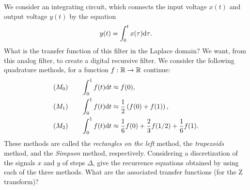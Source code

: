  
\begin{exo}
\label{exo-meth-quadratures-recursive-filter}
 
     We consider an integrating circuit, which connects the input voltage $ x (t) $ and output voltage $ y (t) $ by the equation
\begin{equation*}
y (t) = \int_{0}^{t}{x (\tau) \mathrm{d} \tau}.
\end{equation*}
What is the transfer function of this filter in the Laplace domain? We want, from this analog filter, to create a digital recursive filter. We consider the following quadrature methods, for a function $ f: \mathbb{R} \rightarrow \mathbb{R} $ continue:
\begin{align}
\label{eq-defn-meth-quadrature}
(M_0) \quad \quad \int_0^1{f(t) \mathrm{d} t} & \approx f(0), \\
(M_1) \quad \quad \int_0^1{f(t) \mathrm{d} t} & \approx \frac{1}{2} \left(f(0) + f(1) \right), \\
(M_2) \quad \quad \int_0^1{f(t) \mathrm{d} t} & \approx \frac{1}{6} f(0) + \frac{2}{3} f(1/2) + \frac{1}{6} f(1).
\end{align}
These methods are called the \textit{rectangles on the left} method, the \textit{trapezoids} method, and the \textit{Simpson} method, respectively. Considering a discretization of the signals $ x $ and $ y $ of steps $ \Delta $, give the recurrence equations obtained by using each of the three methods. What are the associated transfer functions (for the Z transform)?
\end{exo}
 
